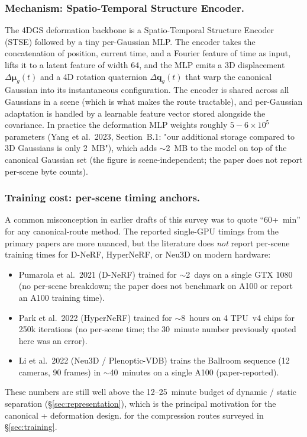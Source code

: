 \subsubsection{Mechanism: Spatio-Temporal Structure Encoder.}
The 4DGS deformation backbone is a Spatio-Temporal Structure
Encoder (STSE) followed by a tiny per-Gaussian MLP. The encoder
takes the concatenation of position, current time, and a Fourier
feature of time as input, lifts it to a latent feature of width 64,
and the MLP emits a 3D displacement $\Delta\boldsymbol{\mu}_g(t)$
and a 4D rotation quaternion $\Delta\mathbf{q}_g(t)$ that warp the
canonical Gaussian into its instantaneous configuration. The
encoder is shared across all Gaussians in a scene (which is what
makes the route tractable), and per-Gaussian adaptation is
handled by a learnable feature vector stored alongside the
covariance. In practice the deformation MLP weights roughly
$5\!-\!6\!\times\!10^{5}$ parameters (Yang et al.\ 2023, Section~B.1:
"our additional storage compared to 3D Gaussians is only
2~MB"), which adds $\sim$2~MB to the model on top of the
canonical Gaussian set (the figure is scene-independent; the
paper does not report per-scene byte counts).

\subsubsection{Training cost: per-scene timing anchors.}
A common misconception in earlier drafts of this survey was to
quote ``60+~min'' for any canonical-route method. The reported
single-GPU timings from the primary papers are more nuanced,
but the literature does \emph{not} report per-scene training
times for D-NeRF, HyperNeRF, or Neu3D on modern hardware:
\begin{itemize}
  \item Pumarola et al.\ 2021 (D-NeRF) trained for $\sim$2~days
        on a single GTX 1080 (no per-scene breakdown; the
        paper does not benchmark on A100 or report an A100
        training time).
  \item Park et al.\ 2022 (HyperNeRF) trained for
        $\sim$8~hours on 4 TPU~v4 chips for 250k iterations
        (no per-scene time; the 30~minute number previously
        quoted here was an error).
  \item Li et al.\ 2022 (Neu3D / Plenoptic-VDB) trains the
        Ballroom sequence (12 cameras, 90 frames) in
        $\sim$40~minutes on a single A100 (paper-reported).
\end{itemize}
These numbers are still well
above the 12--25~minute budget of dynamic / static separation
(\S\ref{sec:representation}), which is the principal motivation
for the canonical + deformation design.
for the compression routes surveyed in
\S\ref{sec:training}.

